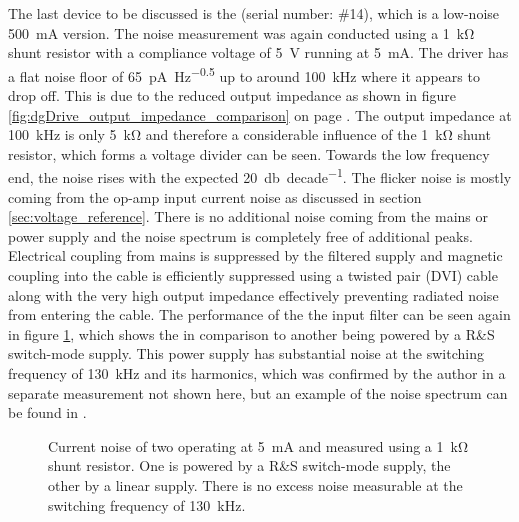 The last device to be discussed is the  (serial number: \#14), which is a low-noise \qty{500}{\mA} version. The noise measurement was again conducted using a \qty{1}{\kilo\ohm} shunt resistor with a compliance voltage of \qty{5}{\V} running at \qty{5}{\mA}. The driver has a flat noise floor of \qty{65}{\pA \per \Hz\tothe{0.5}} up to around \qty{100}{\kHz} where it appears to drop off. This is due to the reduced output impedance as shown in figure \ref{fig:dgDrive_output_impedance_comparison} on page \pageref{fig:dgDrive_output_impedance_comparison}. The output impedance at \qty{100}{\kHz} is only \qty{5}{\kilo\ohm} and therefore a considerable influence of the \qty{1}{\kilo\ohm} shunt resistor, which forms a voltage divider can be seen. Towards the low frequency end, the noise rises with the expected \qty{20}{\decibel \per decade}. The flicker noise is mostly coming from the  op-amp input current noise as discussed in section \ref{sec:voltage_reference}. There is no additional noise coming from the mains or power supply and the noise spectrum is completely free of additional peaks. Electrical coupling from mains is suppressed by the filtered supply and magnetic coupling into the cable is efficiently suppressed using a twisted pair (DVI) cable along with the very high output impedance effectively preventing radiated noise from entering the cable. The performance of the the input filter can be seen again in figure \ref{fig:laser_driver_noise_hmp4040}, which shows the  in comparison to another  being powered by a R\&S  switch-mode supply. This power supply has substantial noise at the switching frequency of \qty{130}{\kHz} and its harmonics, which was confirmed by the author in a separate measurement not shown here, but an example of the noise spectrum can be found in \cite{hmp4040_noise}.
\begin{figure}[ht]
    \centering
    
    \caption{Current noise of two  operating at \qty{5}{\mA} and measured using a \qty{1}{\kilo\ohm} shunt resistor. One is powered by a R\&S  switch-mode supply, the other by a linear supply. There is no excess noise measurable at the switching frequency of \qty{130}{\kHz}.}
    \label{fig:laser_driver_noise_hmp4040}
\end{figure}

